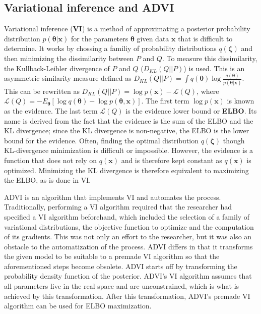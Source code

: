  \subsection{Variational inference and ADVI}\label{sec:advi}
 Variational inference (\textbf{VI}) is a method of approximating a posterior probability distribution $p(\bm{\theta}|\bm{x})$ for the parameters $\bm{\theta}$ given data $\bm{x}$ that is difficult to determine. It works by chossing a familiy of probability distributions $q(\bm{\zeta})$ and then minimizing the dissimilarity between $P$ and $Q$. To measure this dissimilarity, the Kullback-Leibler divergence of $P$ and $Q$ ($D_{KL}(Q||P)$) is used. This is an asymmetric similarity measure defined as $D_{KL}(Q||P) = \int q(\bm{\theta}) \log{\frac{q(\bm{\theta})}{p(\bm{\theta}|\bm{x})}}$. This can be rewritten as $D_{KL}(Q||P) = \log{p(\bm{x})} - \mathcal{L}(Q)$, where $\mathcal{L}(Q) = -E_{\bm{\theta}}[\log{q(\bm{\theta})}-\log{p(\bm{\theta},\bm{x})}]$. The first term $\log{p(\bm{x})}$ is known as the evidence. The last term $\mathcal{L}(Q)$ is the evidence lower bound or \textbf{ELBO}. Its name is derived from the fact that the evidence is the sum of the ELBO and the KL divergence; since the KL divergence is non-negative, the ELBO is the lower bound for the evidence.
 Often, finding the optimal distribution $q(\bm{\zeta})$ though KL-divergence minimization is difficult or impossible. However, the evidence is a function that does not rely on $q(\bm{x})$ and is therefore kept constant as $q(\bm{x})$ is optimized. Minimizing the KL divergence is therefore equivalent to maximizing the ELBO, as is done in VI.
 
 ADVI \cite{kucukelbir2017automatic} is an algorithm that implements VI and automates the process. Traditionally, performing a VI algorithm required that the researcher had specified a VI algorithm beforehand, which included the selection of a family of variational distributions, the objective function to optimize and the computation of its gradients. This was not only an effort to the researcher, but it was also an obstacle to the automatization of the process. ADVI differs in that it transforms the given model to be suitable to a premade VI algorithm so that the aforementioned steps become obsolete.
 ADVI starts off by transforming the probability density function of the posterior. ADVI's VI algorithm assumes that all parameters live in the real space and are unconstrained, which is what is achieved by this transformation. After this transformation, ADVI's premade VI algorithm can be used for ELBO maximization.
 
